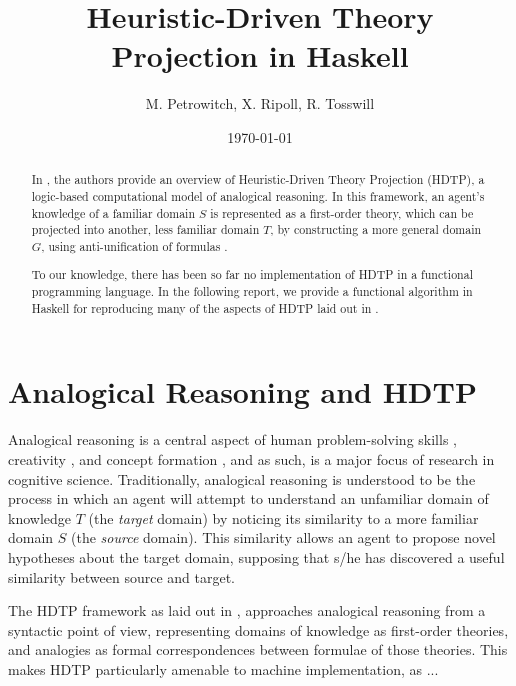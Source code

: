 \documentclass[12pt,a4paper]{article}
\title{Heuristic-Driven Theory Projection in Haskell}
\author{M. Petrowitch, X. Ripoll, R. Tosswill}
\date{\today}
\begin{document}
\maketitle

\begin{abstract}
In \cite{Schmidt-2014}, the authors provide an overview of Heuristic-Driven
Theory Projection (HDTP), a logic-based computational model of analogical
reasoning. In this framework, an agent's knowledge of a familiar domain $S$ is
represented as a first-order theory, which can be projected into another, less
familiar domain $T$, by constructing a more general domain $G$, using
anti-unification of formulas \cite{Plotkin70}. 

To our knowledge, there has been so far no implementation of HDTP in a functional programming language. In the following report, we provide a functional algorithm in Haskell for reproducing many of the aspects of HDTP laid out in \cite{Schmidt-2014}.
\end{abstract}

\vfill

\tableofcontents



\clearpage


\section{Analogical Reasoning and HDTP}
Analogical reasoning is a central aspect of human problem-solving skills
\cite{gentner}, creativity \cite{Besold2015GeneralizeAB}, and concept
formation \cite{hofstadter2013surfaces}, and as such, is a major focus of
research in cognitive science. Traditionally, analogical reasoning is understood to be the process in which an agent will attempt to understand an unfamiliar domain of knowledge $T$ (the \textit{target} domain) by noticing its similarity to a more familiar domain $S$ (the \textit{source} domain). This similarity allows an agent to propose novel hypotheses about the target domain, supposing that s/he has discovered a useful similarity between source and target.

The HDTP framework as laid out in \cite{Schmidt-2014}, approaches analogical reasoning from a syntactic point of view, representing domains of knowledge as first-order theories, and analogies as formal correspondences between formulae of those theories. This makes HDTP particularly amenable to machine implementation, as ... 
\end{document}
